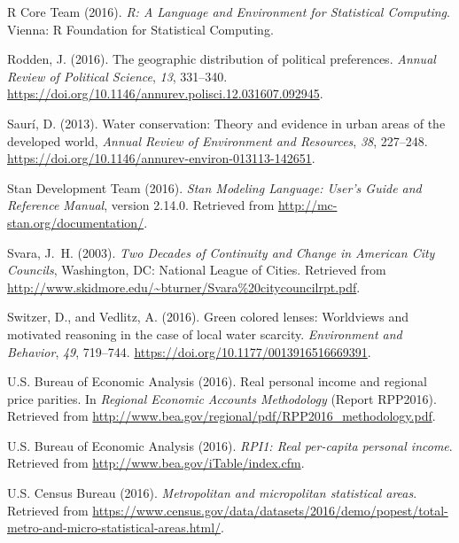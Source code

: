 \documentclass[draft]{agujournal}
\begin{document}
\begin{thebibliography}{33}
  {R Core Team} (2016). \textit{R: A Language and Environment for Statistical
  Computing}.
  Vienna: R Foundation for Statistical Computing.

  Rodden, J. (2016).
  The geographic distribution of political preferences.
  \textit{Annual Review of Political Science}, \textit{13}, 331--340.
  \url{https://doi.org/10.1146/annurev.polisci.12.031607.092945}.

  Saur\'i, D. (2013).
  Water conservation: {T}heory and evidence in urban areas of the developed world,
  \textit{Annual Review of Environment and Resources}, \textit{38}, 227--248.
  \url{https://doi.org/10.1146/annurev-environ-013113-142651}.

  {Stan Development Team} (2016).
  \textit{{S}tan Modeling Language: User's Guide and Reference Manual}, version 2.14.0.
  Retrieved from
  \url{http://mc-stan.org/documentation/}.

  Svara, J.~H. (2003).
  \textit{Two Decades of Continuity and Change in American City Councils},
  Washington, DC: National League of Cities.
  Retrieved from
  \url{http://www.skidmore.edu/~bturner/Svara%20citycouncilrpt.pdf}.

  Switzer, D., and Vedlitz, A. (2016).
  Green colored lenses: Worldviews and motivated reasoning in the case of local
  water scarcity.
  \textit{Environment and Behavior}, \textit{49}, 719--744.
  \url{https://doi.org/10.1177/0013916516669391}.

  U.S. Bureau of Economic Analysis (2016{}).
  Real personal income and regional price parities.
  In \textit{Regional Economic Accounts Methodology\/}
  (Report  RPP2016).
  Retrieved from
  \url{http://www.bea.gov/regional/pdf/RPP2016_methodology.pdf}.

  U.S. Bureau of Economic Analysis (2016{}).
  \textit{{RPI1}: Real per-capita personal income}.
  Retrieved from
  \url{http://www.bea.gov/iTable/index.cfm}.

  U.S. Census Bureau (2016).
  \textit{Metropolitan and micropolitan statistical areas}.
  Retrieved from
  \url{https://www.census.gov/data/datasets/2016/demo/popest/total-metro-and-micro-statistical-areas.html/}.


\end{thebibliography}
\end{document}
